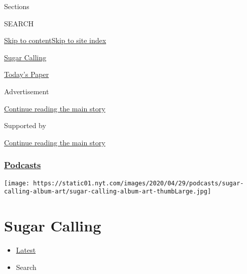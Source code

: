 Sections

SEARCH

\protect\hyperlink{site-content}{Skip to
content}\protect\hyperlink{site-index}{Skip to site index}

\href{https://www.nytimes.com/column/sugar-calling}{Sugar Calling}

\href{https://myaccount.nytimes.com/auth/login?response_type=cookie\&client_id=vi}{}

\href{https://www.nytimes.com/section/todayspaper}{Today's Paper}

Advertisement

\protect\hyperlink{after-top}{Continue reading the main story}

Supported by

\protect\hyperlink{after-sponsor}{Continue reading the main story}

\hypertarget{podcasts}{%
\subsubsection{\texorpdfstring{\href{/spotlight/podcasts}{Podcasts}}{Podcasts}}\label{podcasts}}

\texttt{[image: https://static01.nyt.com/images/2020/04/29/podcasts/sugar-calling-album-art/sugar-calling-album-art-thumbLarge.jpg]}

\hypertarget{sugar-calling}{%
\section{Sugar Calling}\label{sugar-calling}}

\begin{itemize}
\tightlist
\item
  \protect\hyperlink{stream-panel}{Latest}
\item
  Search
\end{itemize}

